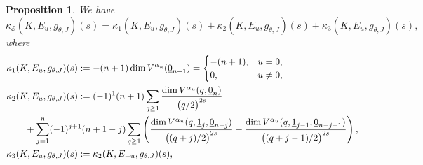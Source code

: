 \documentclass[pdftex]{sigma}
\numberwithin{equation}{section}
\newtheorem{Proposition}[Theorem]{Proposition}
 { \theoremstyle{definition}
\newtheorem{Definition}[Theorem]{Definition}
\newtheorem{Note}[Theorem]{Note}
\newtheorem{Example}[Theorem]{Example}
\newtheorem{Remark}[Theorem]{Remark} }
\newcommand{\RN}{\cE}
\newcommand{\cE}{\mathcal{E}}
\begin{document}
\begin{Proposition}
 We have
 \begin{equation} \label{eq:decom_of_kappa}
 \kappa_\RN (K, E_{u} , g_{\theta , J} ) (s)
 =
 \kappa_{1} (K, E_{u} , g_{\theta , J} ) (s)
 + \kappa_{2} (K, E_{u} , g_{\theta , J} ) (s)
 + \kappa_{3} (K, E_{u} , g_{\theta , J} ) (s),
 \end{equation}
 where
 \begin{align}
 & \kappa_{1} (K, E_{u} , g_{\theta , J} ) (s)
 := -(n+1 ) \dim V^{\alpha_u} ( \underline{0}_{n+1} )
 = \begin{cases}
 -(n+1 ), & u = 0,
 \\
 0, & u \not = 0,
 \end{cases}
 \label{eq:def_of_kappa_1}
 \\
 & \kappa_{2} (K, E_{u} , g_{\theta , J} ) (s)
 :=
 (-1 )^{1} (n+1)
 \sum_{q \geq 1 }
 \frac{
 \dim V^{\alpha_u} ( q, \underline{0}_{n} )
 }{
 \bigl( q /2 \bigr)^{2s}
 }
 \notag
 \\
 & \qquad{}+
 \sum_{j=1}^{n}
 (-1 )^{j+1} (n+1-j)
 \sum_{q \geq 1 }
 \left(
 \frac{
 \dim V^{\alpha_u} ( q, \underline{1}_{j} ,\underline{0}_{n-j} )
 }{
 \bigl( ( q+j)/2 \bigr)^{2s}
 }
 +
 \frac{
 \dim V^{\alpha_u} ( q, \underline{1}_{j-1} ,\underline{0}_{n-j+1} )
 }{
 \bigl( (q+j-1)/2 \bigr)^{2s}
 }
 \right) ,\nonumber
\\
& \kappa_{3} (K, E_{u} , g_{\theta , J} ) (s)
 :=
 \kappa_{2} (K, E_{-u} , g_{\theta , J} ) (s)
 ,
 \label{eq:def_of_kappa_3}
 \end{align}
\end{Proposition}
\end{document}
